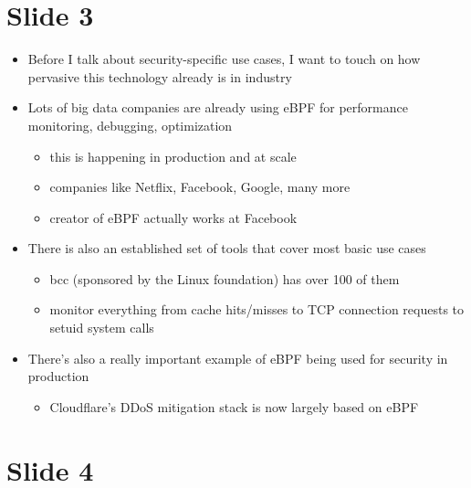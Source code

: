 \documentclass[
  12pt]{findlay}
\providecommand{\tightlist}{\setlength{\itemsep}{0pt}\setlength{\parskip}{0pt}}
\begin{document}
\hypertarget{slide-3}{%
\section{Slide 3}\label{slide-3}}

\begin{itemize}
\tightlist
\item
  Before I talk about security-specific use cases, I want to touch on
  how pervasive this technology already is in industry
\item
  Lots of big data companies are already using eBPF for performance
  monitoring, debugging, optimization

  \begin{itemize}
  \tightlist
  \item
    this is happening in production and at scale
  \item
    companies like Netflix, Facebook, Google, many more
  \item
    creator of eBPF actually works at Facebook
  \end{itemize}
\item
  There is also an established set of tools that cover most basic use
  cases

  \begin{itemize}
  \tightlist
  \item
    bcc (sponsored by the Linux foundation) has over 100 of them
  \item
    monitor everything from cache hits/misses to TCP connection requests
    to setuid system calls
  \end{itemize}
\item
  There's also a really important example of eBPF being used for
  security in production

  \begin{itemize}
  \tightlist
  \item
    Cloudflare's DDoS mitigation stack is now largely based on eBPF
  \end{itemize}
\end{itemize}

\hypertarget{slide-4}{%
\section{Slide 4}\label{slide-4}}
\end{document}
